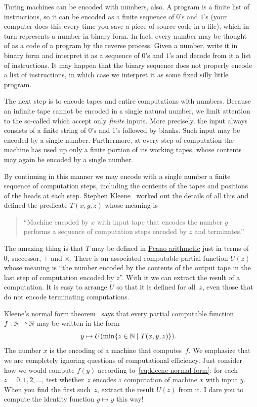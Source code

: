 Turing machines can be encoded with numbers, also. A program is a finite
list of instructions, so it can be encoded as a finite sequence of
$0$'s and $1$'s (your computer does this every time you save a piece of
source code in a file), which in turn represents a number in binary
form. In fact, every number may be thought of as a code of a program
by the reverse process. Given a number, write it in binary form and
interpret it as a sequence of $0$'s and $1$'s and decode from it a
list of instructions. It may happen that the binary sequence does not
properly encode a list of instructions, in which case we interpret it
as some fixed silly little program.

The next step is to encode tapes and entire computations with numbers.
Because an infinite tape cannot be encoded in a single natural number,
we limit attention to the so-called  which
accept only \emph{finite} inputs. More precisely, the input always
consists of a finite string of $0$'s and $1$'s followed by blanks.
Such input may be encoded by a single number. Furthermore, at every
step of computation the machine has used up only a finite portion of
its working tapes, whose contents may again be encoded by a single number.

By continuing in this manner we may encode with a single number a finite
sequence of computation steps, including the contents of the tapes
and positions of the heads at each step. Stephen Kleene~
worked out the details of all this and defined the predicate
$T(x,y,z)$ whose meaning is
%
\begin{quote}
  ``Machine encoded by $x$ with input tape that encodes the number $y$
  performs a sequence of computation steps encoded by $z$ and
  terminates.''
\end{quote}
%
The amazing thing is that $T$ may be defined in \href{https://en.wikipedia.org/wiki/Peano_axioms#Peano_arithmetic_as_first-order_theory}{Peano arithmetic} just
in terms of $0$, successor, $+$ and $\times$. There is an
associated computable partial function $U(z)$ whose meaning is ``the
number encoded by the contents of the output tape in the last step of
computation encoded by $z$''. With it we can extract the result of a computation. It is easy to arrange $U$ so that it is defined for all~$z$, even those that do not encode terminating computations.

Kleene's normal form theorem~
says that every partial computable function $f : \mathbb{N} \mathbin{\rightharpoonup} \mathbb{N}$ may
be written in the form
%
\begin{equation}
  \label{eq:kleene-normal-form}
  y \mapsto U(\min \{z \in \mathbb{N} \mid T(x,y,z)\}).
\end{equation}
%
The number $x$ is the encoding of a machine that computes~$f$. We
emphasize that we are completely ignoring questions of computational
efficiency. Just consider how we would compute $f(y)$ according
to~\eqref{eq:kleene-normal-form}: for each $z = 0, 1, 2, \ldots$, test
whether~$z$ encodes a computation of machine $x$ with input $y$. When
you find the first such~$z$, extract the result $U(z)$ from it. I dare
you to compute the identity function $y \mapsto y$ this way!

